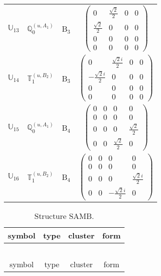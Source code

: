 \documentclass[fleqn,10pt,landscape]{article}
\begin{document}
\begin{itemize}
\begin{center}
\begin{longtable}{c|c|c|c}
$ \mathbb{U}_{13} $ & $\mathbb{Q}_{0}^{(u,A_{1})}$ & B$_{3}$ & $\begin{pmatrix} 0 & \frac{\sqrt{2}}{2} & 0 & 0 \\ \frac{\sqrt{2}}{2} & 0 & 0 & 0 \\ 0 & 0 & 0 & 0 \\ 0 & 0 & 0 & 0 \end{pmatrix}$ \\
$ \mathbb{U}_{14} $ & $\mathbb{T}_{1}^{(u,B_{2})}$ & B$_{3}$ & $\begin{pmatrix} 0 & \frac{\sqrt{2} i}{2} & 0 & 0 \\ - \frac{\sqrt{2} i}{2} & 0 & 0 & 0 \\ 0 & 0 & 0 & 0 \\ 0 & 0 & 0 & 0 \end{pmatrix}$ \\ \hline
$ \mathbb{U}_{15} $ & $\mathbb{Q}_{0}^{(u,A_{1})}$ & B$_{4}$ & $\begin{pmatrix} 0 & 0 & 0 & 0 \\ 0 & 0 & 0 & 0 \\ 0 & 0 & 0 & \frac{\sqrt{2}}{2} \\ 0 & 0 & \frac{\sqrt{2}}{2} & 0 \end{pmatrix}$ \\
$ \mathbb{U}_{16} $ & $\mathbb{T}_{1}^{(u,B_{2})}$ & B$_{4}$ & $\begin{pmatrix} 0 & 0 & 0 & 0 \\ 0 & 0 & 0 & 0 \\ 0 & 0 & 0 & \frac{\sqrt{2} i}{2} \\ 0 & 0 & - \frac{\sqrt{2} i}{2} & 0 \end{pmatrix}$ \\
\end{longtable}
\end{center}
\begin{center}
\renewcommand{\arraystretch}{1.3}
\begin{longtable}{c|c|c|c}
\caption{Structure SAMB.}
 \\
 \hline \hline
symbol & type & cluster & form \\ \hline \endfirsthead

\multicolumn{3}{l}{\tablename\ \thetable{}} \\
 \hline \hline
symbol & type & cluster & form \\ \hline \endhead


\end{longtable}
\end{center}
\end{itemize}
\end{document}
